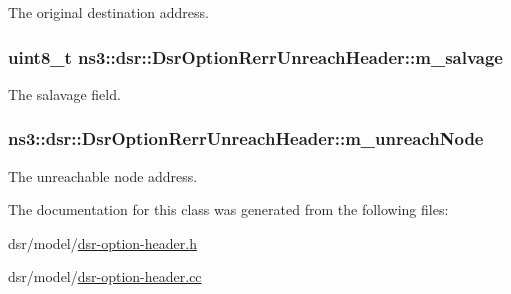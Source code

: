 The original destination address. 

\subsubsection[{\texorpdfstring{m\+\_\+salvage}{m_salvage}}]{\setlength{\rightskip}{0pt plus 5cm}uint8\+\_\+t ns3\+::dsr\+::\+Dsr\+Option\+Rerr\+Unreach\+Header\+::m\+\_\+salvage\hspace{0.3cm}{\ttfamily [private]}}\hypertarget{classns3_1_1dsr_1_1DsrOptionRerrUnreachHeader_ad09b2e2c3dfeaa051cedfa4fcd906924}{}\label{classns3_1_1dsr_1_1DsrOptionRerrUnreachHeader_ad09b2e2c3dfeaa051cedfa4fcd906924}


The salavage field. 

\subsubsection[{\texorpdfstring{m\+\_\+unreach\+Node}{m_unreachNode}}]{ ns3\+::dsr\+::\+Dsr\+Option\+Rerr\+Unreach\+Header\+::m\+\_\+unreach\+Node\hspace{0.3cm}{\ttfamily [private]}}\hypertarget{classns3_1_1dsr_1_1DsrOptionRerrUnreachHeader_a3951086503fabe8a1828059a27b41247}{}\label{classns3_1_1dsr_1_1DsrOptionRerrUnreachHeader_a3951086503fabe8a1828059a27b41247}


The unreachable node address. 



The documentation for this class was generated from the following files\+:\begin{DoxyCompactItemize}
\item 
dsr/model/\hyperlink{dsr-option-header_8h}{dsr-\/option-\/header.\+h}\item 
dsr/model/\hyperlink{dsr-option-header_8cc}{dsr-\/option-\/header.\+cc}\end{DoxyCompactItemize}
